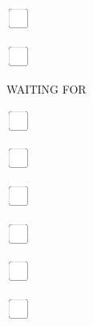 \documentclass[11pt,titlepage]{article}
\begin{document}
\vspace{10mm}

\noindent
\includegraphics[]{checkbox-4mm.pdf}

\vspace{10mm}

\noindent
\includegraphics[]{checkbox-4mm.pdf}

\pagebreak

\small %
\hfill WAITING FOR

\vspace{6mm}

\noindent
\includegraphics[]{checkbox-4mm.pdf}

\vspace{10mm}

\noindent
\includegraphics[]{checkbox-4mm.pdf}

\vspace{10mm}

\noindent
\includegraphics[]{checkbox-4mm.pdf}

\vspace{10mm}

\noindent
\includegraphics[]{checkbox-4mm.pdf}

\vspace{10mm}

\noindent
\includegraphics[]{checkbox-4mm.pdf}

\vspace{10mm}

\noindent
\includegraphics[]{checkbox-4mm.pdf}
\end{document}
